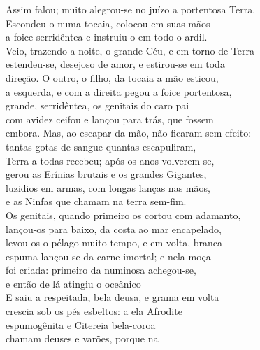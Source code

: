 \begin{pages}
\begin{Rightside}
\quad{}Assim falou; muito alegrou-se no juízo a portentosa Terra.\\
Escondeu-o numa tocaia, colocou em suas mãos\\
a foice serridêntea e instruiu-o em todo o ardil. \\
Veio, trazendo a noite, o grande Céu, e em torno de Terra\\
estendeu-se, desejoso de amor, e estirou-se em toda\\
direção. O outro, o filho, da tocaia a mão esticou,\\
a esquerda, e com a direita pegou a foice portentosa,\\
grande, serridêntea, os genitais do caro pai \\
com avidez ceifou e lançou para trás, que fossem\\
embora. Mas, ao escapar da mão, não ficaram sem efeito:\\
tantas gotas de sangue quantas escapuliram,\\
Terra a todas recebeu; após os anos volverem-se,\\
gerou as Erínias brutais e os grandes Gigantes, \\
luzidios em armas, com longas lanças nas mãos,\\
e as Ninfas que chamam  na terra sem-fim.\\
Os genitais, quando primeiro os cortou com adamanto,\\
lançou-os para baixo, da costa ao mar encapelado,\\
levou-os o pélago muito tempo, e em volta, branca \\
espuma lançou-se da carne imortal; e nela moça\\
foi criada: primeiro da numinosa  achegou-se,\\
e então de lá atingiu o oceânico \\
E saiu a respeitada, bela deusa, e grama em volta\\
crescia sob os pés esbeltos: a ela Afrodite \\
espumogênita e Citereia bela-coroa\\
chamam deuses e varões, porque na \\

\end{Rightside}
\end{pages}
